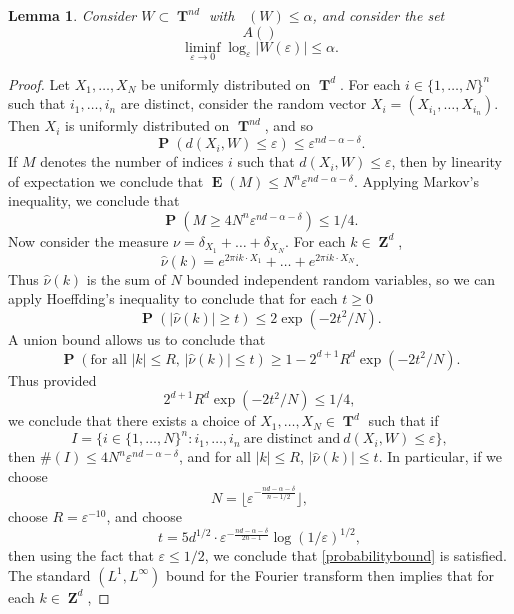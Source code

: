 \documentclass[12pt,reqno]{article}
\numberwithin{equation}{section}
\DeclareMathOperator{\lowminkdim}{\underline{\dim}_{\mathbf{M}}}
\DeclareMathOperator{\ZZ}{\mathbf{Z}}
\DeclareMathOperator{\TT}{\mathbf{T}}
\newtheorem{lemma}[theorem]{Lemma}
\DeclareMathOperator{\EE}{\mathbf{E}}
\DeclareMathOperator{\PP}{\mathbf{P}}
\begin{document}
\begin{lemma}
    Consider $W \subset \TT^{nd}$ with $\lowminkdim(W) \leq \alpha$, and consider the set
    \[ A() \]
    \[ \liminf_{\varepsilon \to 0} \log_\varepsilon |W(\varepsilon)| \leq \alpha. \]
\end{lemma}
\begin{proof}
    Let $X_1, \dots, X_N$ be uniformly distributed on $\TT^d$. For each $i \in \{ 1, \dots, N \}^n$ such that $i_1, \dots, i_n$ are distinct, consider the random vector $X_i = (X_{i_1}, \dots, X_{i_n})$. Then $X_i$ is uniformly distributed on $\TT^{nd}$, and so
    \[ \PP(d(X_i,W) \leq \varepsilon) \leq \varepsilon^{nd - \alpha - \delta}. \]
    If $M$ denotes the number of indices $i$ such that $d(X_i,W) \leq \varepsilon$, then by linearity of expectation we conclude that $\EE(M) \leq N^n \varepsilon^{nd - \alpha - \delta}$. Applying Markov's inequality, we conclude that
    \[ \PP(M \geq 4 N^n \varepsilon^{nd - \alpha - \delta}) \leq 1/4. \]
    Now consider the measure $\nu = \delta_{X_1} + \dots + \delta_{X_N}$. For each $k \in \ZZ^d$,
    \[ \widehat{\nu}(k) = e^{2 \pi i k \cdot X_1} + \dots + e^{2 \pi i k \cdot X_N}. \] 
    Thus $\widehat{\nu}(k)$ is the sum of $N$ bounded independent random variables, so we can apply Hoeffding's inequality to conclude that for each $t \geq 0$
    \[ \PP(|\widehat{\nu}(k)| \geq t) \leq 2 \exp ( - 2 t^2 / N). \]
    A union bound allows us to conclude that
    \[ \PP \left( \text{for all $|k| \leq R$, $|\widehat{\nu}(k)| \leq t$} \right) \geq 1 - 2^{d+1} R^d \exp ( - 2 t^2 / N). \]
    Thus provided
    \begin{equation} \label{probabilitybound}
        2^{d+1} R^d \exp(-2t^2/N) \leq 1/4,
    \end{equation}
    we conclude that there exists a choice of $X_1, \dots, X_N \in \TT^d$ such that if
    \[ I = \{ i \in \{ 1, \dots, N \}^n : i_1, \dots, i_n\ \text{are distinct and}\ d(X_i,W) \leq \varepsilon \}, \]
    then $\#(I) \leq 4 N^n \varepsilon^{nd - \alpha - \delta}$, and for all $|k| \leq R$, $|\widehat{\nu}(k)| \leq t$. In particular, if we choose
    \[ N = \lfloor \varepsilon^{-\frac{nd - \alpha - \delta}{n - 1/2}} \rfloor, \]
    choose $R = \varepsilon^{-10}$, and choose
    \[ t = 5d^{1/2} \cdot \varepsilon^{- \frac{nd - \alpha - \delta}{2n - 1}} \log(1/\varepsilon)^{1/2}, \]
    then using the fact that $\varepsilon \leq 1/2$, we conclude that \eqref{probabilitybound} is satisfied. The standard $(L^1,L^\infty)$ bound for the Fourier transform then implies that for each $k \in \ZZ^d$,

\end{proof}
\end{document}
